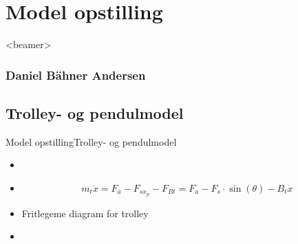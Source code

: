 \section{Model opstilling}
\begin{frame}<beamer>
\frametitle{Daniel Bähner Andersen}
\tableofcontents[currentsection]
\end{frame}


\subsection{Trolley- og pendulmodel}
\begin{frame}{Model opstilling}{Trolley- og pendulmodel}
  \begin{minipage}[t]{0.50\linewidth}
    \begin{itemize}
      	\item<1->[] {
              \begin{figure}[H]
              \centering
              \scalebox{0.75}{}
              \end{figure}}
        \item<3->[] {
     		\begin{equation*}
				m_t \ddot{x} = F_a - F_{sx_p} - F_{Bt} = F_a - F_s \cdot \sin(\theta) - B_t\dot{x}
			\end{equation*}}      
    \end{itemize}           
  \end{minipage}
  \begin{minipage}[t]{0.45\linewidth}
\bigskip
\bigskip 
\bigskip
	\begin{itemize}
    	\item<2->[] Fritlegeme diagram for trolley  
	\end{itemize}    
\medskip 
    \begin{itemize}            
	\item<2->[] {
              \begin{figure}[H]
              \centering
              \scalebox{0.75}{}
              \end{figure}}	     	
    \end{itemize}           
  \end{minipage}
\end{frame} 

